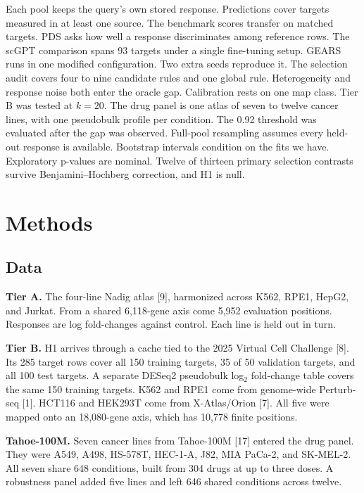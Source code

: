 \documentclass[12pt]{article}
\begin{document}
Each pool keeps the query's own stored response. Predictions cover targets measured in at least one source. The benchmark scores transfer on matched targets. PDS asks how well a response discriminates among reference rows. The scGPT comparison spans 93 targets under a single fine-tuning setup. GEARS runs in one modified configuration. Two extra seeds reproduce it. The selection audit covers four to nine candidate rules and one global rule. Heterogeneity and response noise both enter the oracle gap. Calibration rests on one map class. Tier B was tested at $k = 20$. The drug panel is one atlas of seven to twelve cancer lines, with one pseudobulk profile per condition. The 0.92 threshold was evaluated after the gap was observed. Full-pool resampling assumes every held-out response is available. Bootstrap intervals condition on the fits we have. Exploratory p-values are nominal. Twelve of thirteen primary selection contrasts survive Benjamini--Hochberg correction, and H1 is null.

\section{Methods}

\subsection*{Data}

\textbf{Tier A.} The four-line Nadig atlas [9], harmonized across K562, RPE1, HepG2, and Jurkat. From a shared 6,118-gene axis come 5,952 evaluation positions. Responses are log fold-changes against control. Each line is held out in turn.

\textbf{Tier B.} H1 arrives through a cache tied to the 2025 Virtual Cell Challenge [8]. Its 285 target rows cover all 150 training targets, 35 of 50 validation targets, and all 100 test targets. A separate DESeq2 pseudobulk log$_2$ fold-change table covers the same 150 training targets. K562 and RPE1 come from genome-wide Perturb-seq [1]. HCT116 and HEK293T come from X-Atlas/Orion [7]. All five were mapped onto an 18,080-gene axis, which has 10,778 finite positions.

\textbf{Tahoe-100M.} Seven cancer lines from Tahoe-100M [17] entered the drug panel. They were A549, A498, HS-578T, HEC-1-A, J82, MIA PaCa-2, and SK-MEL-2. All seven share 648 conditions, built from 304 drugs at up to three doses. A robustness panel added five lines and left 646 shared conditions across twelve.
\end{document}
